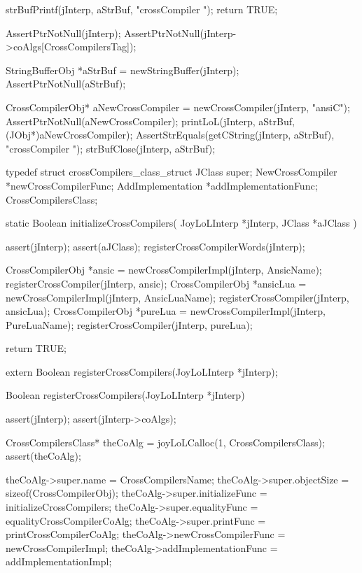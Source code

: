 {{{  strBufPrintf(jInterp, aStrBuf, "crossCompiler ");
  return TRUE;
}
\stopCCode


\startCTest
  AssertPtrNotNull(jInterp);
  AssertPtrNotNull(jInterp->coAlgs[CrossCompilersTag]);

  StringBufferObj *aStrBuf = newStringBuffer(jInterp);
  AssertPtrNotNull(aStrBuf);
  
  CrossCompilerObj* aNewCrossCompiler =
    newCrossCompiler(jInterp, "ansiC");
  AssertPtrNotNull(aNewCrossCompiler);
  printLoL(jInterp, aStrBuf, (JObj*)aNewCrossCompiler);
  AssertStrEquals(getCString(jInterp, aStrBuf), "crossCompiler ");
  strBufClose(jInterp, aStrBuf);
\stopCTest
\stopTestCase
\stopTestSuite

\startTestSuite[registerCrossCompilers]

\startCHeader
typedef struct crossCompilers_class_struct {
  JClass            super;
  NewCrossCompiler  *newCrossCompilerFunc;
  AddImplementation *addImplementationFunc;
} CrossCompilersClass;

\stopCHeader

\startCCode
static Boolean initializeCrossCompilers(
  JoyLoLInterp *jInterp,
  JClass   *aJClass
) {
  assert(jInterp);
  assert(aJClass);
  registerCrossCompilerWords(jInterp);

  CrossCompilerObj *ansic =
    newCrossCompilerImpl(jInterp, AnsicName);
  registerCrossCompiler(jInterp, ansic);
  CrossCompilerObj *ansicLua =
    newCrossCompilerImpl(jInterp, AnsicLuaName);
  registerCrossCompiler(jInterp, ansicLua);
  CrossCompilerObj *pureLua =
    newCrossCompilerImpl(jInterp, PureLuaName);
  registerCrossCompiler(jInterp, pureLua);

  return TRUE;
}
\stopCCode

\startCHeader
extern Boolean registerCrossCompilers(JoyLoLInterp *jInterp);
\stopCHeader
{}

\startCCode
Boolean registerCrossCompilers(JoyLoLInterp *jInterp) {
  assert(jInterp);
  assert(jInterp->coAlgs);
  
  CrossCompilersClass* theCoAlg
    = joyLoLCalloc(1, CrossCompilersClass);
  assert(theCoAlg);
  
  theCoAlg->super.name            = CrossCompilersName;
  theCoAlg->super.objectSize      = sizeof(CrossCompilerObj);
  theCoAlg->super.initializeFunc  = initializeCrossCompilers;
  theCoAlg->super.equalityFunc    = equalityCrossCompilerCoAlg;
  theCoAlg->super.printFunc       = printCrossCompilerCoAlg;
  theCoAlg->newCrossCompilerFunc  = newCrossCompilerImpl;
  theCoAlg->addImplementationFunc = addImplementationImpl;

}}}
